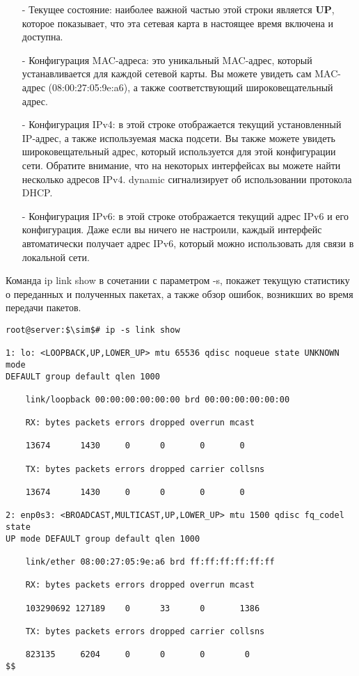 \documentclass[14pt, a4paper]{article}
\begin{document}
\begin{itemize}
    \item[-] Текущее состояние: наиболее важной частью этой строки является \textbf{UP}, которое показывает,
    что эта сетевая карта в настоящее время включена и доступна.
    \item[-] Конфигурация MAC-адреса: это уникальный MAC-адрес, который устанавливается для каждой
    сетевой карты. Вы можете увидеть сам MAC-адрес (08:00:27:05:9e:a6), а также
    соответствующий широковещательный адрес.
    \item[-] Конфигурация IPv4: в этой строке отображается текущий установленный IP-адрес, а также
    используемая маска подсети. Вы также можете увидеть широковещательный адрес, который
    используется для этой конфигурации сети. Обратите внимание, что на некоторых интерфейсах
    вы можете найти несколько адресов IPv4. \colorbox{backcolour}{dynamic} сигнализирует об использовании
    протокола DHCP.
    \item[-] Конфигурация IPv6: в этой строке отображается текущий адрес IPv6 и его конфигурация. Даже
    если вы ничего не настроили, каждый интерфейс автоматически получает адрес IPv6, который
    можно использовать для связи в локальной сети.
\end{itemize}

Команда \colorbox{backcolour}{ip link show} в сочетании с параметром -s, покажет текущую статистику о переданных и
полученных пакетах, а также обзор ошибок, возникших во время передачи пакетов.

\vspace{0.3cm}
\begin{lstlisting}
root@server:$\sim$# ip -s link show

1: lo: <LOOPBACK,UP,LOWER_UP> mtu 65536 qdisc noqueue state UNKNOWN mode
DEFAULT group default qlen 1000

    link/loopback 00:00:00:00:00:00 brd 00:00:00:00:00:00

    RX: bytes packets errors dropped overrun mcast

    13674      1430     0      0       0       0

    TX: bytes packets errors dropped carrier collsns

    13674      1430     0      0       0       0

2: enp0s3: <BROADCAST,MULTICAST,UP,LOWER_UP> mtu 1500 qdisc fq_codel state 
UP mode DEFAULT group default qlen 1000

    link/ether 08:00:27:05:9e:a6 brd ff:ff:ff:ff:ff:ff

    RX: bytes packets errors dropped overrun mcast

    103290692 127189    0      33      0       1386

    TX: bytes packets errors dropped carrier collsns

    823135     6204     0      0       0        0
$$
\end{lstlisting}
\vspace{0.2cm}
\end{document}
